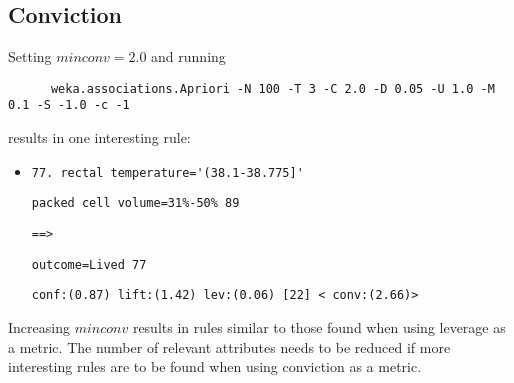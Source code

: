 \subsection{Conviction}
Setting $minconv = 2.0$ and running
\begin{verbatim}
	  weka.associations.Apriori -N 100 -T 3 -C 2.0 -D 0.05 -U 1.0 -M 0.1 -S -1.0 -c -1
\end{verbatim}
results in one interesting rule:
\begin{itemize}
\item \verb|77. rectal temperature='(38.1-38.775]'|

\verb|packed cell volume=31%-50% 89|

\verb|==>|

\verb|outcome=Lived 77|

\verb|conf:(0.87) lift:(1.42) lev:(0.06) [22] < conv:(2.66)>|

\end{itemize}
Increasing $minconv$ results in rules similar to those found when using leverage as a metric. The number of relevant attributes needs to be reduced if more interesting rules are to be found when using conviction as a metric.